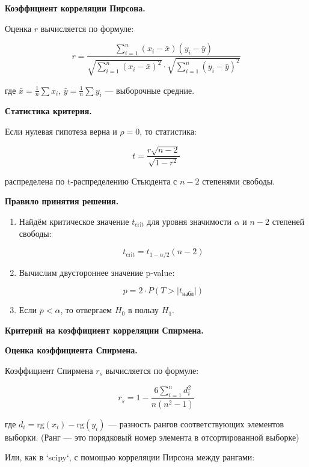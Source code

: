 \documentclass[12pt]{article}
\begin{document}
	\textbf{Коэффициент корреляции Пирсона.}
	
	Оценка $ r $ вычисляется по формуле:
	
	$$ r = \frac{\sum_{i=1}^{n} (x_i - \bar{x})(y_i - \bar{y})}{\sqrt{\sum_{i=1}^{n} (x_i - \bar{x})^2} \cdot \sqrt{\sum_{i=1}^{n} (y_i - \bar{y})^2}} $$
	
	где $ \bar{x} = \frac{1}{n} \sum x_i $, $ \bar{y} = \frac{1}{n} \sum y_i $ — выборочные средние.
	\vspace*{1em}
	
	\textbf{Статистика критерия.}
	
	Если нулевая гипотеза верна и $ \rho = 0 $, то статистика:
	
	$$ t = \frac{r \sqrt{n - 2}}{\sqrt{1 - r^2}} $$
	
	распределена по t-распределению Стьюдента с $n - 2 $ степенями свободы.
	\vspace*{1em}
	
	\textbf{Правило принятия решения.}
	
	\begin{enumerate}
		\item Найдём критическое значение $ t_{\text{crit}} $ для уровня значимости $ \alpha $ и $ n - 2 $ степеней свободы:
		
		$$ t_{\text{crit}} = t_{1 - \alpha / 2}(n - 2) $$
		
		\item Вычислим двустороннее значение p-value:
		
		$$ p = 2 \cdot P(T > |t_{\text{набл}}|) $$
		
		\item Если $ p < \alpha $, то отвергаем $ H_0 $ в пользу $ H_1 $.
	\end{enumerate}
	\vspace*{1em}
	
	\textbf{Критерий на коэффициент корреляции Спирмена.}
	\vspace*{1em}
	
	\textbf{Оценка коэффициента Спирмена.}
	
	Коэффициент Спирмена $ r_s $ вычисляется по формуле:
	
	$$ r_s = 1 - \frac{6 \sum_{i=1}^{n} d_i^2}{n(n^2 - 1)} $$
	
	где $ d_i = \text{rg}(x_i) - \text{rg}(y_i) $ — разность рангов соответствующих элементов выборки.
	(Ранг — это порядковый номер элемента в отсортированной выборке)
	
	Или, как в `scipy`, с помощью корреляции Пирсона между рангами:
	
\end{document}
